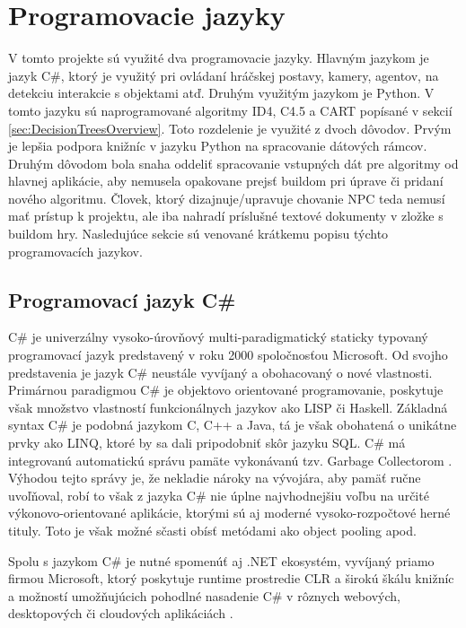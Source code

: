 \documentclass[slovak, master]{diploma}
\begin{document}
\section{Programovacie jazyky}
\label{sec:langs}
V tomto projekte sú využité dva programovacie jazyky. Hlavným jazykom je jazyk C\#, ktorý je využitý pri ovládaní hráčskej postavy, kamery, agentov, na detekciu interakcie s objektami atď. Druhým využitým jazykom je Python. V tomto jazyku sú naprogramované algoritmy ID4, C4.5 a CART popísané v sekcií \ref{sec:DecisionTreesOverview}. Toto rozdelenie je využité z dvoch dôvodov. Prvým je lepšia podpora knižníc v jazyku Python na spracovanie dátových rámcov. Druhým dôvodom bola snaha oddeliť spracovanie vstupných dát pre algoritmy od hlavnej aplikácie, aby nemusela opakovane prejsť buildom pri úprave či pridaní nového algoritmu. Človek, ktorý dizajnuje/upravuje chovanie NPC teda nemusí mať prístup k projektu, ale iba nahradí príslušné textové dokumenty v zložke s buildom hry. Nasledujúce sekcie sú venované krátkemu popisu týchto programovacích jazykov.

\subsection{Programovací jazyk C\#}
\label{sec:langsCShartp}
C\# je univerzálny vysoko-úrovňový multi-paradigmatický staticky typovaný programovací jazyk predstavený v roku 2000 spoločnosťou Microsoft. Od svojho predstavenia je jazyk C\# neustále vyvíjaný a obohacovaný o nové vlastnosti. Primárnou paradigmou C\# je objektovo orientované programovanie, poskytuje však množstvo vlastností funkcionálnych jazykov ako LISP či Haskell. Základná syntax C\# je podobná jazykom C, C++ a Java, tá je však obohatená o unikátne prvky ako LINQ, ktoré by sa dali pripodobniť skôr jazyku SQL. C\# má integrovanú automatickú správu pamäte vykonávanú tzv. Garbage Collectorom \cite{DotNetBook}. Výhodou tejto správy je, že nekladie nároky na vývojára, aby pamäť ručne uvoľňoval, robí to však z jazyka C\# nie úplne najvhodnejšiu voľbu na určité výkonovo-orientované aplikácie, ktorými sú aj moderné vysoko-rozpočtové herné tituly. Toto je však možné sčasti obísť metódami ako object pooling apod.

Spolu s jazykom C\# je nutné spomenúť aj .NET ekosystém, vyvíjaný priamo firmou Microsoft, ktorý poskytuje runtime prostredie CLR a širokú škálu knižníc a možností umožňujúcich pohodlné nasadenie C\# v rôznych webových, desktopových či cloudových aplikáciách \cite{DotNetBook}.
\end{document}
